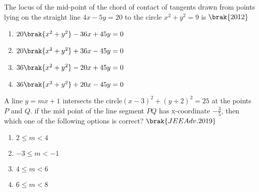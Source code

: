              \item The locus of the mid-point of the chord of contact of tangents drawn from points lying on the straight line $4x-5y=20$ to the circle $x^2+y^2=9$ is
                 \hfill$\brak{2012}$
                 \begin{multicols}{2}
             \begin{enumerate}
                 \item $20\brak{x^2+y^2}-36x+45y=0$
                 \item $20\brak{x^2+y^2}+36x-45y=0$
                 \item $36\brak{x^2+y^2}-20x+45y=0$
                 \item $36\brak{x^2+y^2}+20x-45y=0$
             \end{enumerate}
             \end{multicols}
             \item A line $y=mx+1$ intersects the circle$(x-3)^2+(y+2)^2=25$ at the points $P$ and $Q$. if the mid point of the line segment $PQ$ has x-coordinate $-\frac{3}{5}$, then which one of the following options is correct?
                 \hfill$\brak{JEE Adv. 2019}$
                 \begin{multicols}{2}
             \begin{enumerate}
                 \item $2\le m<4$
                 \item $-3\le m<-1$
                 \item $4\le m<6$
                 \item $6\le m<8$
             \end{enumerate}
             \end{multicols}
             

     
     


        
